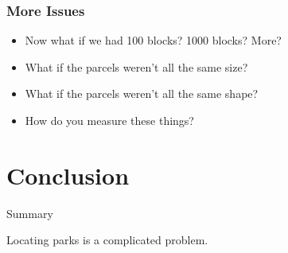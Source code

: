 \documentclass[10pt, compress]{beamer}
\begin{document}
\begin{frame}[fragile]
\frametitle{More Issues}
\begin{itemize}
\item Now what if we had 100 blocks? 1000 blocks? More?
\item What if the parcels weren't all the same size?
\item What if the parcels weren't all the same shape?
\item How do you measure these things?
\end{itemize}
\end{frame}


\section{Conclusion}

\begin{frame}{Summary}

  Locating parks is a complicated problem.

\end{frame}


\end{document}
